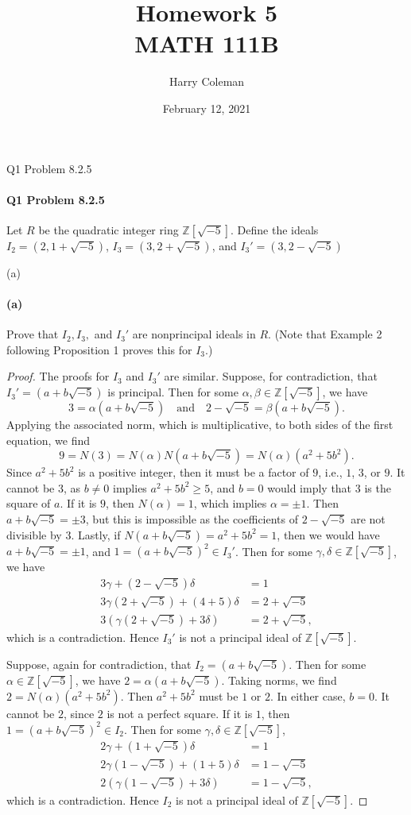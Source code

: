 \documentclass[12pt]{article}
\title{\vspace{-0.5in}Homework 5\\
    \large MATH 111B
}
\author{Harry Coleman}
\date{February 12, 2021}
\newenvironment{fullbox}{\begin{lrbox}{\savefullbox}\begin{minipage}{\dimexpr\textwidth-2\fboxsep\relax}}{\end{minipage}\end{lrbox}\begin{center}\framebox[\textwidth]{\usebox{\savefullbox}}\end{center}}
\newenvironment{pbox}[1][]{\begin{fullbox}\ifx#1\empty\else\paragraph{#1}\fi}{\end{fullbox}}
\theoremstyle{definition}
\newcommand{\isp}[1]{\quad\text{#1}\quad}
\newcommand{\Z}{\mathbb{Z}}
\begin{document}
\maketitle


\begin{pbox}[Q1 Problem 8.2.5]
    Let $R$ be the quadratic integer ring $\Z[\sqrt{-5}]$. Define the ideals $I_2=(2,1+\sqrt{-5})$, $I_3=(3,2+\sqrt{-5})$, and $I_3'=(3,2-\sqrt{-5})$
\end{pbox}

\begin{pbox}[(a)]
    Prove that $I_2, I_3,$ and $I_3'$ are nonprincipal ideals in $R$. (Note that Example 2 following Proposition 1 proves this for $I_3$.)
\end{pbox}

\begin{proof}
    The proofs for $I_3$ and $I_3'$ are similar. Suppose, for contradiction, that $I_3' = (a + b\sqrt{-5})$ is principal. Then for some $\alpha, \beta \in \Z[\sqrt{-5}]$, we have
    \[
        3 = \alpha(a + b\sqrt{-5}) \isp{and} 2 - \sqrt{-5} = \beta(a + b\sqrt{-5}).
    \]
    Applying the associated norm, which is multiplicative, to both sides of the first equation, we find
    \[
        9 = N(3) = N(\alpha)N(a + b\sqrt{-5}) = N(\alpha)(a^2 + 5b^2).
    \]
    Since $a^2 + 5b^2$ is a positive integer, then it must be a factor of $9$, i.e., $1$, $3$, or $9$. It cannot be $3$, as $b \ne 0$ implies $a^2 + 5b^2 \geq 5$, and $b = 0$ would imply that $3$ is the square of $a$. If it is $9$, then $N(\alpha) = 1$, which implies $\alpha = \pm1$. Then $a + b\sqrt{-5} = \pm 3$, but this is impossible as the coefficients of $2 - \sqrt{-5}$ are not divisible by $3$. Lastly, if $N(a + b\sqrt{-5}) =a^2 + 5b^2 = 1$, then we would have $a + b\sqrt{-5} = \pm1$, and $1 = (a + b\sqrt{-5})^2 \in I_3'$. Then for some $\gamma, \delta \in \Z[\sqrt{-5}]$, we have
    \begin{align*}
        3\gamma + (2 - \sqrt{-5})\delta &= 1 \\
        3\gamma(2 + \sqrt{-5}) + (4 + 5)\delta &= 2 + \sqrt{-5} \\
        3(\gamma(2 + \sqrt{-5}) + 3\delta) &= 2 + \sqrt{-5},
    \end{align*}
    which is a contradiction. Hence $I_3'$ is not a principal ideal of $\Z[\sqrt{-5}]$.
    
    Suppose, again for contradiction, that $I_2 = (a + b\sqrt{-5})$. Then for some $\alpha\in \Z[\sqrt{-5}]$, we have $2 = \alpha(a + b\sqrt{-5})$. Taking norms, we find $2 = N(\alpha)(a^2 + 5b^2)$. Then $a^2 + 5b^2$ must be $1$ or $2$. In either case, $b = 0$. It cannot be $2$, since $2$ is not a perfect square. If it is $1$, then $1 = (a + b\sqrt{-5})^2 \in I_2$. Then for some $\gamma, \delta \in \Z[\sqrt{-5}]$,
    \begin{align*}
        2\gamma + (1 + \sqrt{-5})\delta &= 1 \\
        2\gamma(1 - \sqrt{-5}) + (1 + 5)\delta &= 1 - \sqrt{-5} \\
        2(\gamma(1 - \sqrt{-5}) + 3\delta) &= 1 - \sqrt{-5},
    \end{align*}
    which is a contradiction. Hence $I_2$ is not a principal ideal of $\Z[\sqrt{-5}]$.
    

\end{proof}
\end{document}
